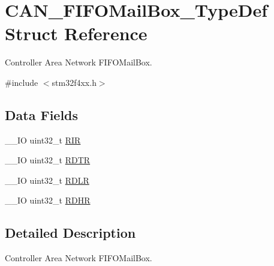 \hypertarget{struct_c_a_n___f_i_f_o_mail_box___type_def}{\section{C\-A\-N\-\_\-\-F\-I\-F\-O\-Mail\-Box\-\_\-\-Type\-Def Struct Reference}
\label{struct_c_a_n___f_i_f_o_mail_box___type_def}
}


Controller Area Network F\-I\-F\-O\-Mail\-Box.  




{\ttfamily \#include $<$stm32f4xx.\-h$>$}

\subsection*{Data Fields}
\begin{DoxyCompactItemize}
\item 
\-\_\-\-\_\-\-I\-O uint32\-\_\-t \hyperlink{struct_c_a_n___f_i_f_o_mail_box___type_def_a0acc8eb90b17bef5b9e03c7ddaacfb0b}{R\-I\-R}
\item 
\-\_\-\-\_\-\-I\-O uint32\-\_\-t \hyperlink{struct_c_a_n___f_i_f_o_mail_box___type_def_a9563d8a88d0db403b8357331bea83a2e}{R\-D\-T\-R}
\item 
\-\_\-\-\_\-\-I\-O uint32\-\_\-t \hyperlink{struct_c_a_n___f_i_f_o_mail_box___type_def_ae1c569688eedd49219cd505b9c22121b}{R\-D\-L\-R}
\item 
\-\_\-\-\_\-\-I\-O uint32\-\_\-t \hyperlink{struct_c_a_n___f_i_f_o_mail_box___type_def_a7f11f42ba9d3bc5cd4a4f5ea0214608e}{R\-D\-H\-R}
\end{DoxyCompactItemize}


\subsection{Detailed Description}
Controller Area Network F\-I\-F\-O\-Mail\-Box. 

